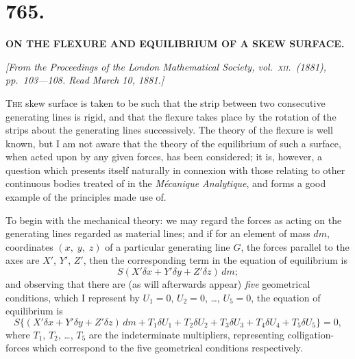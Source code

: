 \documentclass[11pt,a4paper]{book}
\begin{document}
\newpage

\section*{765.}

\begin{center}
\textbf{ON THE FLEXURE AND EQUILIBRIUM OF A SKEW SURFACE.}
\end{center}

\noindent\textit{[From the \textit{Proceedings of the London Mathematical Society}, vol.\ \textsc{xii}.\ (1881), pp.\ 103---108. Read March 10, 1881.]}

\vspace{\baselineskip}

\textsc{The} skew surface is taken to be such that the strip between two consecutive generating lines is rigid, and that the flexure takes place by the rotation of the strips about the generating lines successively. The theory of the flexure is well known, but I am not aware that the theory of the equilibrium of such a surface, when acted upon by any given forces, has been considered; it is, however, a question which presents itself naturally in connexion with those relating to other continuous bodies treated of in the \textit{M\'{e}canique Analytique}, and forms a good example of the principles made use of.

To begin with the mechanical theory: we may regard the forces as acting on the generating lines regarded as material lines; and if for an element of mass $dm$, coordinates $(x,\; y,\; z)$ of a particular generating line $G$, the forces parallel to the axes are $X'$, $Y'$, $Z'$, then the corresponding term in the equation of equilibrium is
\[
S(X'\delta x + Y'\delta y + Z'\delta z)\,dm;
\]
and observing that there are (as will afterwards appear) \textit{five} geometrical conditions, which I represent by $U_1 = 0$, $U_2 = 0$, \ldots, $U_5 = 0$, the equation of equilibrium is
\[
S\{(X'\delta x + Y'\delta y + Z'\delta z)\,dm + T_1\delta U_1 + T_2\delta U_2 + T_3\delta U_3 + T_4\delta U_4 + T_5\delta U_5\} = 0,
\]
where $T_1$, $T_2$, \ldots, $T_5$ are the indeterminate multipliers, representing colligation-forces which correspond to the five geometrical conditions respectively.
\end{document}
